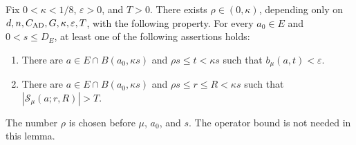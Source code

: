 \begin{lemma}\label{lem:annular-alternative}
Fix $0<\kappa<1/8$, $\varepsilon>0$, and $T>0$.  There exists
$\rho\in(0,\kappa)$, depending only on
$d,n,C_{\rm AD},G,\kappa,\varepsilon,T$, with the following property.
For every $a_0\in E$ and $0<s\leq D_E$, at least one of the
following assertions holds:
\begin{enumerate}
\item There are $a\in E\cap B(a_0,\kappa s)$ and
      $\rho s\leq t<\kappa s$ such that
      $b_\mu(a,t)<\varepsilon$.
\item There are $a\in E\cap B(a_0,\kappa s)$ and
      $\rho s\leq r\leq R<\kappa s$ such that
      $|\mathcal S_\mu(a;r,R)|>T$.
\end{enumerate}
The number $\rho$ is chosen before $\mu$, $a_0$, and $s$.
The operator bound is not needed in this lemma.
\end{lemma}

